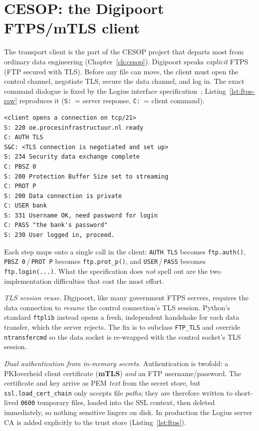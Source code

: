\chapter{CESOP: the Digipoort FTPS/mTLS client}\label{anx:ftps}

The transport client is the part of the CESOP project that departs most from ordinary data engineering (Chapter~\ref{ch:cesop}). Digipoort speaks \emph{explicit} FTPS (FTP secured with TLS). Before any file can move, the client must open the control channel, negotiate TLS, secure the data channel, and log in. The exact command dialogue is fixed by the Logius interface specification~\cite{digipoort-ftps}; Listing~\ref{lst:ftps-raw} reproduces it (\texttt{S:}~= server response, \texttt{C:}~= client command).

\begin{lstlisting}[caption={Setting up a TLS connection from Digipoort FTP interface specification~\cite{digipoort-ftps}.},label={lst:ftps-raw}]
<client opens a connection on tcp/21>
S: 220 oe.procesinfrastructuur.nl ready
C: AUTH TLS
S&C: <TLS connection is negotiated and set up>
S: 234 Security data exchange complete
C: PBSZ 0
S: 200 Protection Buffer Size set to streaming
C: PROT P
S: 200 Data connection is private
C: USER bank
S: 331 Username OK, need password for login
C: PASS "the bank's password"
S: 230 User logged in, proceed.
\end{lstlisting}

Each step maps onto a single call in the client: \texttt{AUTH TLS} becomes \texttt{ftp.auth()}, \texttt{PBSZ~0}\,/\,\texttt{PROT~P} becomes \texttt{ftp.prot\_p()}, and \texttt{USER}\,/\,\texttt{PASS} becomes \texttt{ftp.login(...)}. What the specification does \emph{not} spell out are the two implementation difficulties that cost the most effort.

\emph{TLS session reuse.} Digipoort, like many government FTPS servers, requires the data connection to \emph{resume} the control connection's TLS session. Python's standard \texttt{ftplib} instead opens a fresh, independent handshake for each data transfer, which the server rejects. The fix is to subclass \texttt{FTP\_TLS} and override \texttt{ntransfercmd} so the data socket is re-wrapped with the control socket's TLS session.

\emph{Dual authentication from in-memory secrets.} Authentication is twofold: a PKIoverheid client certificate (\textbf{mTLS}) \emph{and} an FTP username/password. The certificate and key arrive as PEM \emph{text} from the secret store, but \texttt{ssl.load\_cert\_chain} only accepts file \emph{paths}; they are therefore written to short-lived \texttt{0600} temporary files, loaded into the SSL context, then deleted immediately, so nothing sensitive lingers on disk. In production the Logius server CA is added explicitly to the trust store (Listing~\ref{lst:ftps}).

